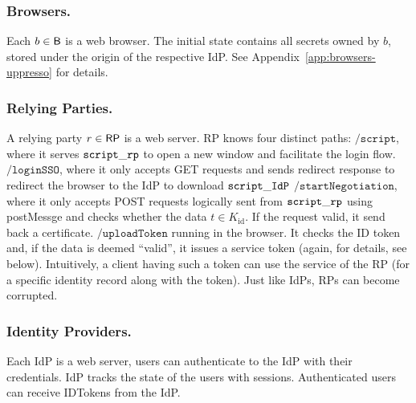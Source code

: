   \subsubsection{Browsers.} Each $b \in \mathsf{B}$ is a web browser. 
  The initial state contains all secrets owned by $b$, stored under the origin of the
  respective IdP. See Appendix~\ref{app:browsers-uppresso} for details.
  
  \subsubsection{Relying Parties.} 
  A relying party $r \in \mathsf{RP}$ is a web server. RP knows four distinct paths: 
  $\mathtt{/script}$, where it serves $\mathtt{script\_rp}$ to open a new window 
  and facilitate the login flow.
  $\mathtt{/loginSSO}$, where it only accepts GET requests and sends 
  redirect response to redirect the browser to the IdP to download $\mathtt{script\_IdP}$
  $\mathtt{/startNegotiation}$, where it only accepts POST requests logically sent 
  from $\mathtt{script\_rp}$ using postMessge and checks whether the data $t\in K_\text{id}$.
  If the request valid, it send back a certificate.
  $\mathtt{/uploadToken}$ running in the browser. It checks the ID token and, 
  if the data is deemed ``valid'', it issues a service token (again, for details, see below). 
  Intuitively, a client having such a token can use the service of the RP 
  (for a specific identity record along with the token). 
  Just like IdPs, RPs can become corrupted.
  
  \subsubsection{Identity Providers.} Each IdP is a web server, 
  users can authenticate to the IdP with their credentials. 
  IdP tracks the state of the users with sessions. 
  Authenticated users can receive IDTokens from the IdP. 
  
  
